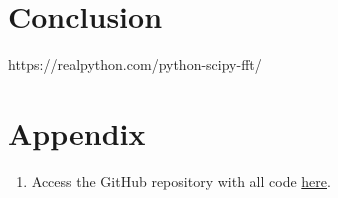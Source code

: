 \documentclass{article}
\begin{document}
\section{Conclusion}

\begin{thebibliography}{9} %
     https://realpython.com/python-scipy-fft/
\end{thebibliography}

\section{Appendix}
\begin{enumerate}
    \item Access the GitHub repository with all code \href{https://github.com/margheritatonon/approximation-II-assignment}{here}.
\end{enumerate}
\end{document}
